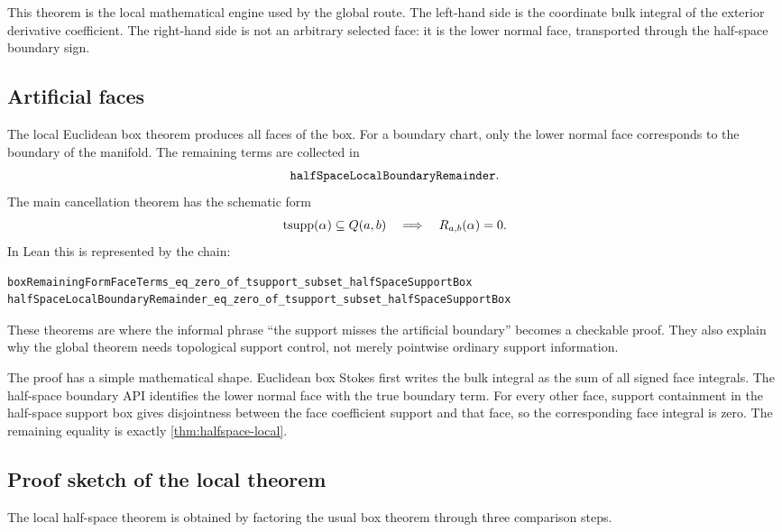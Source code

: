 This theorem is the local mathematical engine used by the global route.  The
left-hand side is the coordinate bulk integral of the exterior derivative
coefficient.  The right-hand side is not an arbitrary selected face: it is the
lower normal face, transported through the half-space boundary sign.

\subsection{Artificial faces}

The local Euclidean box theorem produces all faces of the box.  For a boundary
chart, only the lower normal face corresponds to the boundary of the manifold.
The remaining terms are collected in
\[
\code{halfSpaceLocalBoundaryRemainder}.
\]
The main cancellation theorem has the schematic form
\[
  \operatorname{tsupp}(\alpha)\subseteq Q(a,b)
  \quad\Longrightarrow\quad
  R_{a,b}(\alpha)=0.
\]
In Lean this is represented by the chain:
\begin{lstlisting}[language=Lean]
boxRemainingFormFaceTerms_eq_zero_of_tsupport_subset_halfSpaceSupportBox
halfSpaceLocalBoundaryRemainder_eq_zero_of_tsupport_subset_halfSpaceSupportBox
\end{lstlisting}
These theorems are where the informal phrase ``the support misses the
artificial boundary'' becomes a checkable proof.  They also explain why the
global theorem needs topological support control, not merely pointwise
ordinary support information.

The proof has a simple mathematical shape.  Euclidean box Stokes first writes
the bulk integral as the sum of all signed face integrals.  The half-space
boundary API identifies the lower normal face with the true boundary term.
For every other face, support containment in the half-space support box gives
disjointness between the face coefficient support and that face, so the
corresponding face integral is zero.  The remaining equality is exactly
\cref{thm:halfspace-local}.

\subsection{Proof sketch of the local theorem}

The local half-space theorem is obtained by factoring the usual box theorem
through three comparison steps.

